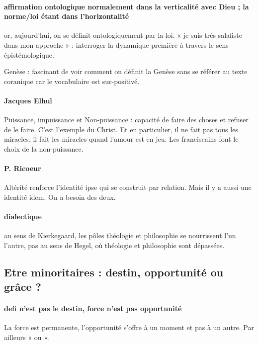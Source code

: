 \paragraph{affirmation ontologique normalement dans la verticalité avec Dieu ; la norme/loi étant dans l’horizontalité} or, aujourd’hui, on se définit ontologiquement par la loi. « je suis très salafiste dans mon approche » : interroger la dynamique première à travers le sens épistémologique. 
\begin{Ex}
Genèse : fascinant de voir comment on définit la Genèse sans se référer au texte coranique car le vocabulaire est sur-positivé. 
\end{Ex}

\paragraph{Jacques Elhul} Puissance, impuissance et Non-puissance : capacité de faire des choses et refuser de le faire. C’est l’exemple du Christ. Et en particulier, il ne fait pas tous les miracles, il fait les miracles quand l’amour est en jeu. Les franciscains font le choix de la non-puissance.

\paragraph{P. Ricoeur} Altérité renforce l’identité ipse qui se construit par relation. Mais il y a aussi une identité idem. On a besoin des deux.
\paragraph{dialectique} au sens de Kierkegaard, les pôles théologie et philosophie se nourrissent l’un l’autre, pas au sens de Hegel, où théologie et philosophie sont dépassées.  
\subsection{Etre minoritaires : destin, opportunité ou grâce ? }
\paragraph{defi n’est pas le destin, force n’est pas opportunité} La force est permanente, l’opportunité s’offre à un moment et pas à un autre. Par ailleurs « ou ».
